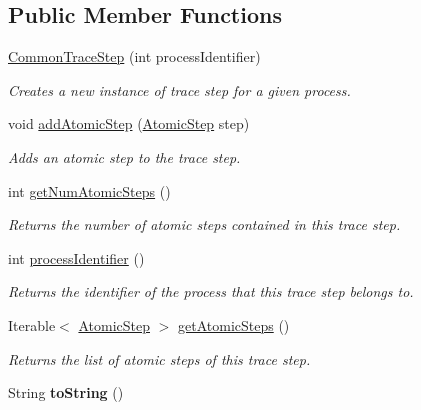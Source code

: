 \subsection*{Public Member Functions}
\begin{DoxyCompactItemize}
\item 
\hyperlink{classedu_1_1udel_1_1cis_1_1vsl_1_1civl_1_1kripke_1_1common_1_1CommonTraceStep_ae074675f30cdd48c9d53704ec3b1cf89}{Common\+Trace\+Step} (int process\+Identifier)
\begin{DoxyCompactList}\small\item\em Creates a new instance of trace step for a given process. \end{DoxyCompactList}\item 
void \hyperlink{classedu_1_1udel_1_1cis_1_1vsl_1_1civl_1_1kripke_1_1common_1_1CommonTraceStep_a0847ede4f14ced36b1e2e3fd4504f313}{add\+Atomic\+Step} (\hyperlink{interfaceedu_1_1udel_1_1cis_1_1vsl_1_1civl_1_1kripke_1_1IF_1_1AtomicStep}{Atomic\+Step} step)
\begin{DoxyCompactList}\small\item\em Adds an atomic step to the trace step. \end{DoxyCompactList}\item 
int \hyperlink{classedu_1_1udel_1_1cis_1_1vsl_1_1civl_1_1kripke_1_1common_1_1CommonTraceStep_ac75369caf206858be9700ef19f61b841}{get\+Num\+Atomic\+Steps} ()
\begin{DoxyCompactList}\small\item\em Returns the number of atomic steps contained in this trace step. \end{DoxyCompactList}\item 
int \hyperlink{classedu_1_1udel_1_1cis_1_1vsl_1_1civl_1_1kripke_1_1common_1_1CommonTraceStep_a0849f978cbe28997152258c9e887e974}{process\+Identifier} ()
\begin{DoxyCompactList}\small\item\em Returns the identifier of the process that this trace step belongs to. \end{DoxyCompactList}\item 
Iterable$<$ \hyperlink{interfaceedu_1_1udel_1_1cis_1_1vsl_1_1civl_1_1kripke_1_1IF_1_1AtomicStep}{Atomic\+Step} $>$ \hyperlink{classedu_1_1udel_1_1cis_1_1vsl_1_1civl_1_1kripke_1_1common_1_1CommonTraceStep_a2262d400930abdc4378cc7c866099eb9}{get\+Atomic\+Steps} ()
\begin{DoxyCompactList}\small\item\em Returns the list of atomic steps of this trace step. \end{DoxyCompactList}\item 
\hypertarget{classedu_1_1udel_1_1cis_1_1vsl_1_1civl_1_1kripke_1_1common_1_1CommonTraceStep_a3c72d48bb8f9d6daee827dc72e83be51}{}String {\bfseries to\+String} ()\label{classedu_1_1udel_1_1cis_1_1vsl_1_1civl_1_1kripke_1_1common_1_1CommonTraceStep_a3c72d48bb8f9d6daee827dc72e83be51}


\end{DoxyCompactItemize}
